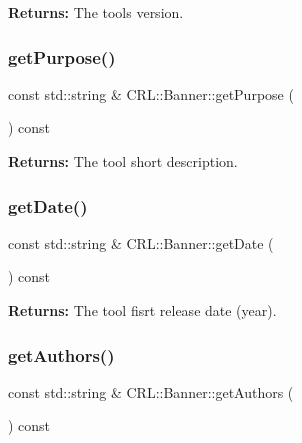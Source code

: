 {\bfseries Returns\+:} The tool\textquotesingle{}s version. \mbox{\label{classCRL_1_1Banner_aa9898c902b80eff41d549432136de3bc}} 
\subsubsection{\texorpdfstring{get\+Purpose()}{getPurpose()}}
{\footnotesize\ttfamily const std\+::string \& C\+R\+L\+::\+Banner\+::get\+Purpose (\begin{DoxyParamCaption}{ }\end{DoxyParamCaption}) const\hspace{0.3cm}{\ttfamily [inline]}}

{\bfseries Returns\+:} The tool short description. \mbox{\label{classCRL_1_1Banner_a398db63bc8ce319d85e4d1245cbcce62}} 
\subsubsection{\texorpdfstring{get\+Date()}{getDate()}}
{\footnotesize\ttfamily const std\+::string \& C\+R\+L\+::\+Banner\+::get\+Date (\begin{DoxyParamCaption}{ }\end{DoxyParamCaption}) const\hspace{0.3cm}{\ttfamily [inline]}}

{\bfseries Returns\+:} The tool fisrt release date (year). \mbox{\label{classCRL_1_1Banner_aa61a32222853ae9f4298302ca53788bc}} 
\subsubsection{\texorpdfstring{get\+Authors()}{getAuthors()}}
{\footnotesize\ttfamily const std\+::string \& C\+R\+L\+::\+Banner\+::get\+Authors (\begin{DoxyParamCaption}{ }\end{DoxyParamCaption}) const\hspace{0.3cm}{\ttfamily [inline]}}

